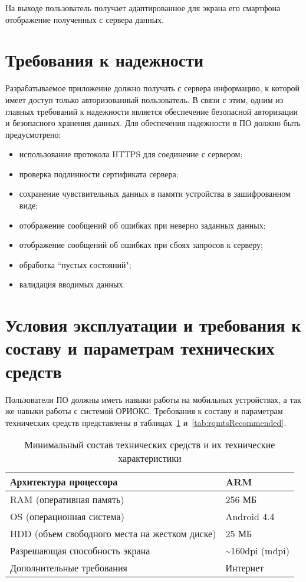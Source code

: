 На выходе пользователь получает адаптированное для экрана его смартфона отображение полученных с сервера данных.

\section{Требования к надежности}
\label{sec:reliabilityRqmts}
Разрабатываемое приложение должно получать с сервера информацию, к которой имеет доступ только авторизованный пользователь.
В связи с этим, одним из главных требований к надежности является обеспечение безопасной авторизации и безопасного хранения данных.
Для обеспечения надежности в ПО должно быть предусмотрено:
\begin{itemize}
  \item использование протокола HTTPS для соединение с сервером;
  \item проверка подлинности сертификата сервера;
  \item сохранение чувствительных данных в памяти устройства в зашифрованном виде;
  \item отображение сообщений об ошибках при неверно заданных данных;
  \item отображение сообщений об ошибках при сбоях запросов к серверу;
  \item обработка ``пустых состояний";
  \item валидация вводимых данных.
\end{itemize}

\section{Условия эксплуатации и требования к составу и параметрам технических средств}
\label{sec:expluatation}
Пользователи ПО должны иметь навыки работы на мобильных устройствах, а так же навыки работы с системой ОРИОКС.
Требования к составу и параметрам технических средств представлены в таблицах~\ref{tab:rqmtsMin} и~\ref{tab:rqmtsRecommended}.

\begin{table}[ht]
  \centering
  \caption{Минимальный состав технических средств и их технические характеристики}
  \label{tab:rqmtsMin}
  \begin{tabular}{|l|l|}
    \hline Архитектура процессора & ARM \\ \hline
    RAM (оперативная память) & 256 МБ \\ \hline
    OS (операционная система) & Android 4.4 \\ \hline
    HDD (объем свободного места на жестком диске) & 25 МБ \\ \hline
    Разрешающая способность экрана & \textasciitilde 160dpi (mdpi) \\ \hline
    Дополнительные требования & Интернет \\ \hline
  \end{tabular}
\end{table}

